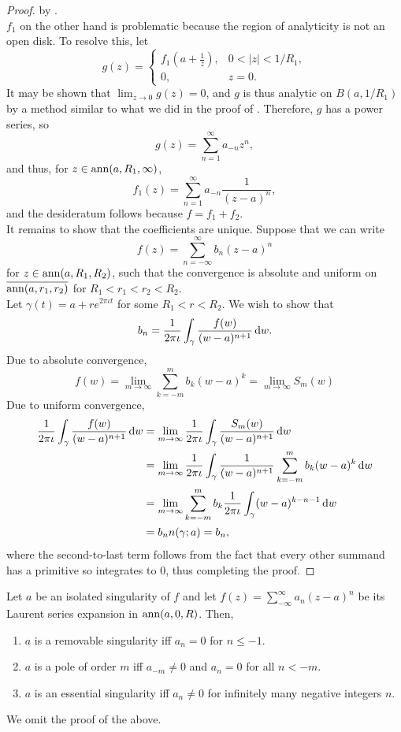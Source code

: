 \begin{proof}
		by .\\
		$f_1$ on the other hand is problematic because the region of analyticity is not an open disk. To resolve this, let
		\[ g(z) = \begin{cases} f_1(a+\frac{1}{z}), & 0 < |z| < 1/R_1, \\ 0, & z = 0. \end{cases} \]
		It may be shown that $\lim_{z\to 0} g(z) = 0$, and $g$ is thus analytic on $B(a,1/R_1)$ by a method similar to what we did in the proof of . Therefore, $g$ has a power series, so
		\[ g(z) = \sum_{n=1}^{\infty} a_{-n} z^n, \]
		and thus, for $z \in \operatorname{ann}(a,R_1,\infty)$,
		\[ f_1(z) = \sum_{n=1}^{\infty} a_{-n} \frac{1}{(z-a)^n}, \]
		and the desideratum follows because $f = f_1 + f_2$.\\

		It remains to show that the coefficients are unique. Suppose that we can write
		\[ f(z) = \sum_{n=-\infty}^{\infty} b_n (z-a)^n \]
		for $z \in \operatorname{ann}(a,R_1,R_2)$, such that the convergence is absolute and uniform on $\overline{\operatorname{ann}(a,r_1,r_2)}$ for $R_1 < r_1 < r_2 < R_2$.\\
		Let $\gamma(t) = a+re^{2\pi\iota t}$ for some $R_1 < r < R_2$. We wish to show that
		\[ b_n = \frac{1}{2\pi\iota} \int_{\gamma} \frac{f(w)}{(w-a)^{n+1}} \dif w. \]
		Due to absolute convergence,
		\[ f(w) = \lim_{m\to\infty} \sum_{k=-m}^m b_k (w-a)^k = \lim_{m\to\infty} S_m(w)  \]
		Due to uniform convergence,
		\begin{align*}
			\frac{1}{2\pi\iota} \int_{\gamma} \frac{f(w)}{(w-a)^{n+1}} \dif w &= \lim_{m\to\infty} \frac{1}{2\pi\iota} \int_{\gamma} \frac{S_m(w)}{(w-a)^{n+1}} \dif w \\
				&= \lim_{m\to\infty} \frac{1}{2\pi\iota} \int_{\gamma} \frac{1}{(w-a)^{n+1}} \sum_{k=-m}^m b_k (w-a)^k \dif w \\
				&= \lim_{m\to\infty} \sum_{k=-m}^m b_k \frac{1}{2\pi\iota} \int_{\gamma}(w-a)^{k-n-1} \dif w \\
				&= b_n n(\gamma;a) = b_n,
		\end{align*}
		where the second-to-last term follows from the fact that every other summand has a primitive so integrates to $0$, thus completing the proof.
	\end{proof}

	\begin{corollary}
		Let $a$ be an isolated singularity of $f$ and let $f(z) = \sum_{-\infty}^{\infty} a_n (z-a)^n$ be its Laurent series expansion in $\operatorname{ann}(a,0,R)$. Then,
		\begin{enumerate}[label=(\alph*)]
			\item $a$ is a removable singularity iff $a_n = 0$ for $n \le -1$.
			\item $a$ is a pole of order $m$ iff $a_{-m} \ne 0$ and $a_n = 0$ for all $n < -m$.
			\item $a$ is an essential singularity iff $a_n \ne 0$ for infinitely many negative integers $n$.
		\end{enumerate}
	\end{corollary}
	We omit the proof of the above.

